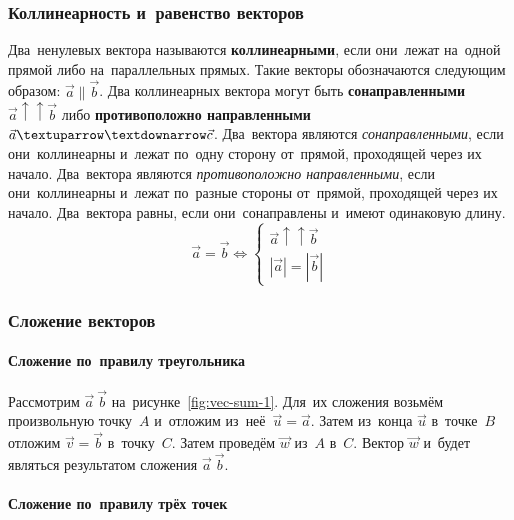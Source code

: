 \documentclass[]{scrartcl}
\begin{document}
\subsubsection{Коллинеарность и~равенство векторов}
Два~ненулевых вектора называются \textbf{коллинеарными}, если они~лежат на~одной прямой либо на~параллельных прямых. Такие векторы обозначаются следующим образом: ${\textstyle \vec{a} \parallel \vec{b}}$. Два коллинеарных вектора могут быть \textbf{сонаправленными} ${\textstyle \vec{a} \uparrow \uparrow   \vec{b}}$ либо \textbf{противоположно направленными} ${\textstyle \vec{a} \textuparrow \textdownarrow \vec{c}}$. Два~вектора являются \emph{сонаправленными}, если они~коллинеарны и~лежат по~одну сторону от~прямой, проходящей через их начало. Два~вектора являются \emph{противоположно направленными}, если они~коллинеарны и~лежат по~разные стороны от~прямой, проходящей через их начало.
Два~вектора равны, если они~сонаправлены и~имеют одинаковую длину.
\begin{equation}\label{eq:vec-equality}
\vec{a}=\vec{b} \Leftrightarrow
	\begin{cases}
	\vec{a}\uparrow \uparrow \vec{b}\\
	|\vec{a}|=|\vec{b}|
	\end{cases}
\end{equation}
\subsubsection{Сложение векторов}

\paragraph{Сложение по~правилу треугольника}

Рассмотрим ${\textstyle \vec{a}\ \vec{b}}$ на~рисунке~\ref{fig:vec-sum-1}. Для~их сложения возьмём произвольную точку~${\textstyle A}$ и~отложим из~неё~${\textstyle \vec{u} = \vec{a}}$. Затем из~конца ${\textstyle \vec{u}}$ в~точке~${\textstyle B}$ отложим ${\textstyle \vec{v} = \vec{b}}$ в~точку~${\textstyle C}$. Затем проведём ${\textstyle \vec{w}}$ из~${\textstyle A}$ в~${\textstyle C}$. Вектор ${\textstyle \vec{w}}$ и~будет являться результатом сложения ${\textstyle \vec{a}\ \vec{b}}$.

\paragraph{Сложение по~правилу трёх точек}
\end{document}
